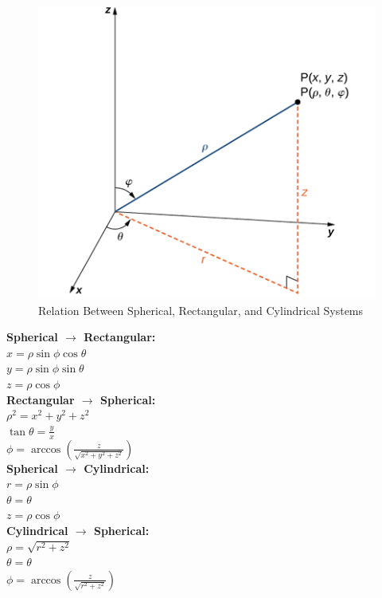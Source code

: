        \begin{figure} [hbt!]
            \centering
            \includegraphics[scale=0.6]{Resources/Unit3Vectors/relation.PNG}
            \caption*{Relation Between Spherical, Rectangular, and Cylindrical Systems}
        \end{figure}

        \noindent \textbf{Spherical $\rightarrow$ Rectangular:} \\
        $  x=\rho\sin\phi\cos\theta$ \\
        $  y=\rho\sin\phi\sin\theta$ \\
        $  z=\rho\cos\phi$ \\
        \textbf{Rectangular $\rightarrow$ Spherical:} \\
        $  \rho^2=x^2+y^2+z^2$ \\
        $  \tan\theta=\frac{y}{x}$ \\
        $  \phi=\arccos{(\frac{z}{\sqrt{x^2+y^2+z^2}})}$ \\
        \textbf{Spherical $\rightarrow$ Cylindrical:} \\
        $  r=\rho\sin\phi$ \\
        $  \theta=\theta$ \\
        $  z=\rho\cos\phi$ \\
        \textbf{Cylindrical $\rightarrow$ Spherical:} \\
        $  \rho=\sqrt{r^2+z^2}$ \\
        $  \theta=\theta$ \\
        $  \phi=\arccos{(\frac{z}{\sqrt{r^2+z^2}})}$

